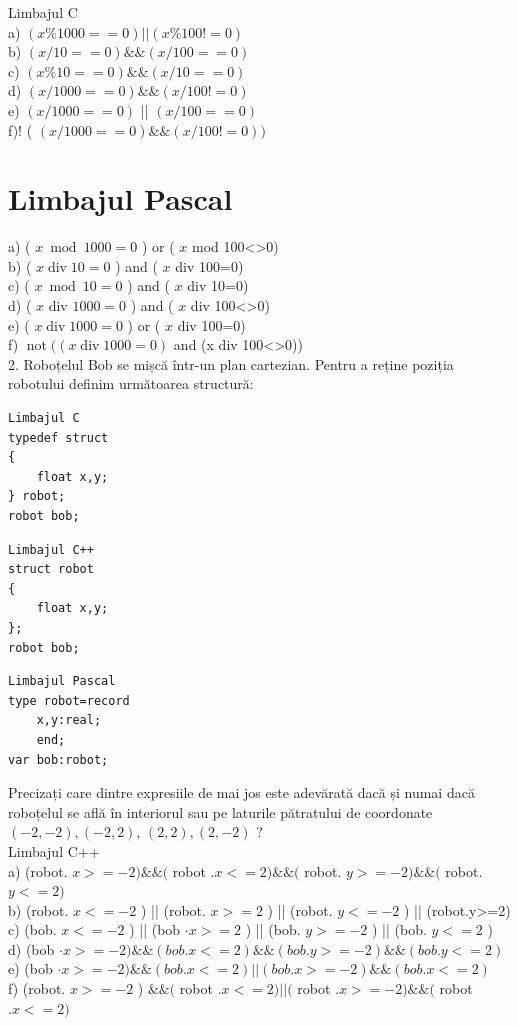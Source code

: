 \documentclass[10pt]{article}
\begin{document}
Limbajul C\\
a) $(x \% 1000==0)|\mid(x \% 100!=0)$\\
b) $(x / 10==0) \& \&(x / 100==0)$\\
c) $(x \% 10==0) \& \&(x / 10==0)$\\
d) $(x / 1000==0) \& \&(x / 100!=0)$\\
e) $(x / 1000==0)$ || $(x / 100==0)$\\
f)! ( $(x / 1000==0) \& \&(x / 100!=0))$

\section*{Limbajul Pascal}
a) ( $x \bmod 1000=0$ ) or ( $x$ mod 100<>0)\\
b) ( $x \operatorname{div} 10=0$ ) and ( $x$ div 100=0)\\
c) ( $x \bmod 10=0$ ) and ( $x$ div 10=0)\\
d) ( $x$ div $1000=0$ ) and ( $x$ div 100<>0)\\
e) ( $x \operatorname{div} 1000=0$ ) or ( $x$ div 100=0)\\
f) $\operatorname{not}((x \operatorname{div} 1000=0)$ and (x div 100<>0))\\
2. Roboțelul Bob se mișcă într-un plan cartezian. Pentru a reține poziția robotului definim următoarea structură:

\begin{verbatim}
Limbajul C
typedef struct
{
    float x,y;
} robot;
robot bob;
\end{verbatim}

\begin{verbatim}
Limbajul C++
struct robot
{
    float x,y;
};
robot bob;
\end{verbatim}

\begin{verbatim}
Limbajul Pascal
type robot=record
    x,y:real;
    end;
var bob:robot;
\end{verbatim}

Precizați care dintre expresiile de mai jos este adevărată dacă și numai dacă roboțelul se află în interiorul sau pe laturile pătratului de coordonate $(-2,-2),(-2,2)$, $(2,2),(2,-2)$ ?\\
Limbajul C++\\
a) (robot. $x>=-2) \& \&($ robot $. x<=2) \& \&($ robot. $y>=-2) \& \&($ robot. $y<=2)$\\
b) (robot. $x<=-2$ ) || (robot. $x>=2$ ) || (robot. $y<=-2$ ) || (robot.y>=2)\\
c) (bob. $x<=-2$ ) || (bob $\cdot x>=2$ ) || (bob. $y>=-2$ ) || (bob. $y<=2$ )\\
d) (bob $\cdot x>=-2) \& \&(b o b . x<=2) \& \&(b o b . y>=-2) \& \&(b o b . y<=2)$\\
e) (bob $\cdot x>=-2) \& \&(b o b . x<=2)|\mid(b o b . x>=-2) \& \&(b o b . x<=2)$\\
f) (robot. $x>=-2$ ) $\& \&($ robot $. x<=2)|\mid($ robot $. x>=-2) \& \&($ robot $. x<=2)$
\end{document}
